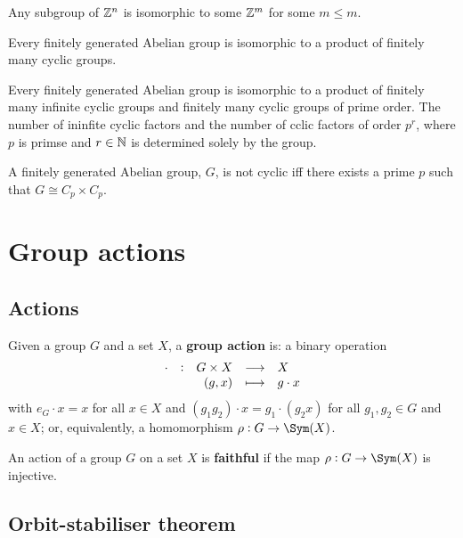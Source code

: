 \documentclass[../Year2.tex]{subfiles}
\begin{document}
\begin{lemma}
    Any subgroup of $\mathbb{Z}^n$ is isomorphic to some $\mathbb{Z}^m$ for some $m\leq m$.
\end{lemma}

\begin{theorem}
    Every finitely generated Abelian group is isomorphic to a product of finitely many cyclic groups.
\end{theorem}

\begin{theorem}
    Every finitely generated Abelian group is isomorphic to a product of finitely many infinite cyclic groups and finitely many cyclic groups of prime order. The number of ininfite cyclic factors and the number of cclic factors of order $p^r$, where $p$ is primse and $r\in\mathbb{N}$ is determined solely by the group.
\end{theorem}

\begin{theorem}
    A finitely generated Abelian group, $G$, is not cyclic iff there exists a prime $p$ such that $G\cong C_p\times C_p$.
\end{theorem}

\section{Group actions}

\subsection{Actions}

\begin{definition}[Actions]
    Given a group $G$ and a set $X$, a \textbf{group action} is: a binary operation \[
        \function[\cdot]{G\times X}{X}{(g,x)}{g\cdot x}
    \] with $e_G\cdot x=x$ for all $x\in X$ and $(g_1g_2)\cdot x = g_1 \cdot (g_2 x)$ for all $g_1,g_2\in G$ and $x\in X$; or, equivalently, a homomorphism $\rho:G\rightarrow \Sym(X)$.
\end{definition}

\begin{definition}
    An action of a group $G$ on a set $X$ is \textbf{faithful} if the map $\rho:G\rightarrow\Sym(X)$ is injective.
\end{definition}

\subsection{Orbit-stabiliser theorem}
\end{document}
